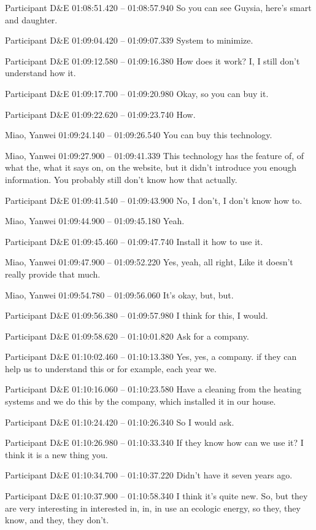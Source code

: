 {Participant D\&E 01:08:51.420 -- 01:08:57.940
So you can see Guysia, here's smart and daughter.

Participant D\&E 01:09:04.420 -- 01:09:07.339
System to minimize.

Participant D\&E 01:09:12.580 -- 01:09:16.380
How does it work? I, I still don't understand how it.

Participant D\&E 01:09:17.700 -- 01:09:20.980
Okay, so you can buy it.

Participant D\&E 01:09:22.620 -- 01:09:23.740
How.

Miao, Yanwei 01:09:24.140 -- 01:09:26.540
You can buy this technology.

Miao, Yanwei 01:09:27.900 -- 01:09:41.339
This technology has the feature of, of what the, what it says on, on the website, but it didn't introduce you enough information. You probably still don't know how that actually.

Participant D\&E 01:09:41.540 -- 01:09:43.900
No, I don't, I don't know how to.

Miao, Yanwei 01:09:44.900 -- 01:09:45.180
Yeah.

Participant D\&E 01:09:45.460 -- 01:09:47.740
Install it how to use it.

Miao, Yanwei 01:09:47.900 -- 01:09:52.220
Yes, yeah, all right, Like it doesn't really provide that much.

Miao, Yanwei 01:09:54.780 -- 01:09:56.060
It's okay, but, but.

Participant D\&E 01:09:56.380 -- 01:09:57.980
I think for this, I would.

Participant D\&E 01:09:58.620 -- 01:10:01.820
Ask for a company.

Participant D\&E 01:10:02.460 -- 01:10:13.380
Yes, yes, a company. if they can help us to understand this or for example, each year we.

Participant D\&E 01:10:16.060 -- 01:10:23.580
Have a cleaning from the heating systems and we do this by the company, which installed it in our house.

Participant D\&E 01:10:24.420 -- 01:10:26.340
So I would ask.

Participant D\&E 01:10:26.980 -- 01:10:33.340
If they know how can we use it? I think it is a new thing you.

Participant D\&E 01:10:34.700 -- 01:10:37.220
Didn't have it seven years ago.

Participant D\&E 01:10:37.900 -- 01:10:58.340
I think it's quite new. So, but they are very interesting in interested in, in, in use an ecologic energy, so they, they know, and they, they don't.

}
